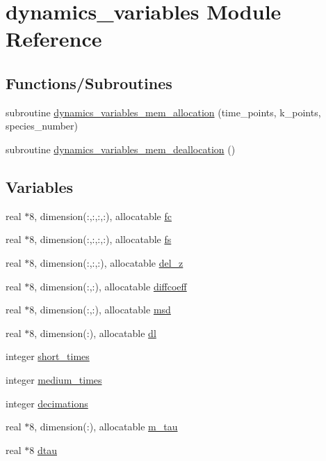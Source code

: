 \hypertarget{namespacedynamics__variables}{}\section{dynamics\+\_\+variables Module Reference}
\label{namespacedynamics__variables}
\subsection*{Functions/\+Subroutines}
\begin{DoxyCompactItemize}
\item 
subroutine \hyperlink{namespacedynamics__variables_a5f591595162eb74c3236758d9132588f}{dynamics\+\_\+variables\+\_\+mem\+\_\+allocation} (time\+\_\+points, k\+\_\+points, species\+\_\+number)
\item 
subroutine \hyperlink{namespacedynamics__variables_a68946260698d0399925366a48a4513ef}{dynamics\+\_\+variables\+\_\+mem\+\_\+deallocation} ()
\end{DoxyCompactItemize}
\subsection*{Variables}
\begin{DoxyCompactItemize}
\item 
real $\ast$8, dimension(\+:,\+:,\+:,\+:), allocatable \hyperlink{namespacedynamics__variables_a14b6bfb7fef60f79297bef079ff3abd1}{fc}
\item 
real $\ast$8, dimension(\+:,\+:,\+:,\+:), allocatable \hyperlink{namespacedynamics__variables_a2cd5b8b80f9bebe0e15a0d532d082d5c}{fs}
\item 
real $\ast$8, dimension(\+:,\+:,\+:), allocatable \hyperlink{namespacedynamics__variables_a7fbb51910c646d86285a6bdd809b09f0}{del\+\_\+z}
\item 
real $\ast$8, dimension(\+:,\+:), allocatable \hyperlink{namespacedynamics__variables_a99c20709f211a88c64061031e4fb816f}{diffcoeff}
\item 
real $\ast$8, dimension(\+:,\+:), allocatable \hyperlink{namespacedynamics__variables_a11b1153d883a50528bc1843306c887fe}{msd}
\item 
real $\ast$8, dimension(\+:), allocatable \hyperlink{namespacedynamics__variables_a969e1e44448d09e33d3f8a77ea0dbc6a}{dl}
\item 
integer \hyperlink{namespacedynamics__variables_ae4ed48f39cb51ae5223de16688bf98dc}{short\+\_\+times}
\item 
integer \hyperlink{namespacedynamics__variables_a12f963fbaf3733c50be7b2eb013133f6}{medium\+\_\+times}
\item 
integer \hyperlink{namespacedynamics__variables_a779c965a5816a34b1bc10ea35aec740b}{decimations}
\item 
real $\ast$8, dimension(\+:), allocatable \hyperlink{namespacedynamics__variables_a3bba8f0483c8ea097be9ffbcd0ccbdc5}{m\+\_\+tau}
\item 
real $\ast$8 \hyperlink{namespacedynamics__variables_aceafdd63e4e63ce7758f0052ca50638f}{dtau}
\end{DoxyCompactItemize}


